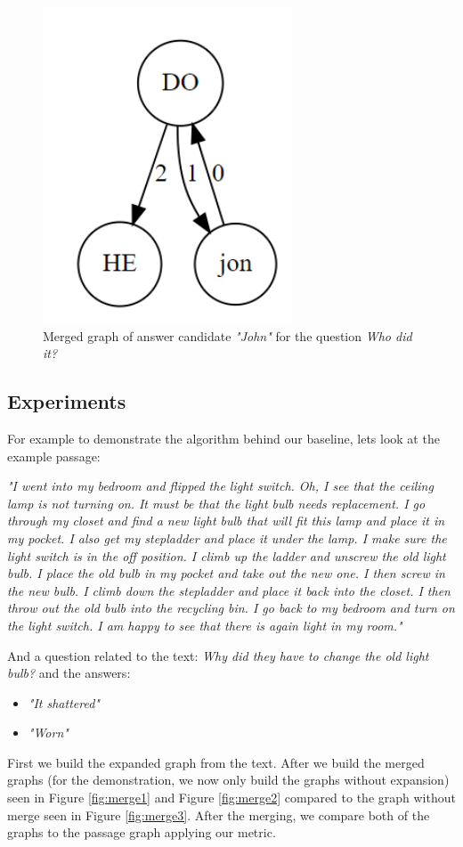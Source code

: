 \begin{figure}
	\centering
	\includegraphics[scale=0.3]{figures/merge}
	\caption{Merged graph of answer candidate \textit{"John"} for the
		question \textit{Who did it?}}
	\label{fig:merge}
\end{figure}

\subsection{Experiments}
\label{sec:exp}

For example to demonstrate the algorithm behind our baseline, lets look at the example passage:
\begin{center}
	\textit{ "I went into my bedroom and flipped the light switch. Oh, I see that the ceiling lamp is not turning on. It must be that the light bulb needs replacement. I go through my closet and find a new light bulb that will fit this lamp and place it in my pocket. I also get my stepladder and place it under the lamp. I make sure the light switch is in the off position. I climb up the ladder and unscrew the old light bulb. I place the old bulb in my pocket and take out the new one. I then screw in the new bulb. I climb down the stepladder and place it back into the closet. I then throw out the old bulb into the recycling bin. I go back to my bedroom and turn on the light switch. I am happy to see that there is again light in my room."}
\end{center}
And a question related to the text: \textit{Why did they have to change the old light bulb?} and the answers:
\begin{itemize}
	\item \textit{"It shattered"}
	\item \textit{"Worn"}
\end{itemize}
First we build the expanded graph from the text. After we build the merged graphs (for the demonstration, we now only build the graphs without expansion) seen in Figure \ref{fig:merge1} and Figure \ref{fig:merge2} compared to the graph without merge seen in Figure \ref{fig:merge3}. After the merging, we compare both of the graphs to the passage graph applying our metric.

